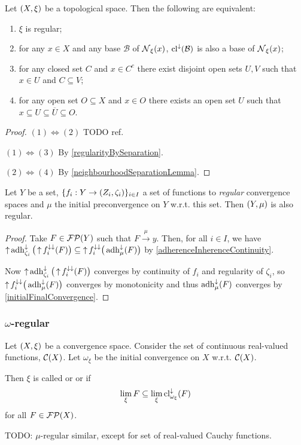 \begin{proposition} \label{topologicalRegularity}
Let $\sSet{X,\xi}$ be a topological space. Then the following are equivalent:
\begin{enumerate}
\item $\xi$ is regular;
\item for any $x\in X$ and any base $\mathcal{B}$ of $\operatorname{\mathcal{N}}_\xi(x)$, $\operatorname{cl}^\downarrow(\mathcal{B})$ is also a base of $\operatorname{\mathcal{N}}_\xi(x)$;
\item for any closed set $C$ and $x\in C^c$ there exist disjoint open sets $U,V$ such that $x\in U$ and $C\subseteq V$;
\item for any open set $O\subseteq X$ and $x\in O$ there exists an open set $U$ such that $x\subseteq U\subseteq \overline{U} \subseteq O$.
\end{enumerate}
\end{proposition}
\begin{proof}
$(1) \Leftrightarrow (2)$ TODO ref.

$(1) \Leftrightarrow (3)$ By \ref{regularityBySeparation}.

$(2) \Leftrightarrow (4)$ By \ref{neighbourhoodSeparationLemma}.
\end{proof}

\begin{proposition} \label{regularityInitialConvergence}
Let $Y$ be a set, $\{f_i: Y\to \sSet{Z_i, \zeta_i}\}_{i\in I}$ a set of functions to \emph{regular} convergence spaces and $\mu$ the initial preconvergence on $Y$ w.r.t. this set. Then $\sSet{Y,\mu}$ is also regular.
\end{proposition}
\begin{proof}
Take $F\in \operatorname{\mathcal{FP}}(Y)$ such that $F\overset{\mu}{\longrightarrow} y$. Then, for all $i\in I$, we have $\operatorname{\uparrow}\operatorname{adh}_{\zeta_i}^\downarrow\big(\operatorname{\uparrow} f_i^{\downarrow\downarrow}(F)\big)\subseteq \operatorname{\uparrow} f_i^{\downarrow\downarrow}\big(\operatorname{adh}_{\mu}^{\downarrow}(F)\big)$ by \ref{adherenceInherenceContinuity}.

Now $\operatorname{\uparrow}\operatorname{adh}_{\zeta_i}^\downarrow\big(\operatorname{\uparrow} f_i^{\downarrow\downarrow}(F)\big)$ converges by continuity of $f_i$ and regularity of $\zeta_i$, so $\operatorname{\uparrow} f_i^{\downarrow\downarrow}\big(\operatorname{adh}_{\mu}^{\downarrow}(F)\big)$ converges by monotonicity and thus $\operatorname{adh}_{\mu}^{\downarrow}(F)$ converges by \ref{initialFinalConvergence}.
\end{proof}

\subsubsection{$\omega$-regular}
\begin{definition}
Let $\sSet{X,\xi}$ be a convergence space. Consider the set of continuous real-valued functions, $\operatorname{\mathcal{C}}(X)$. Let $\omega_\xi$ be the initial convergence on $X$ w.r.t. $\operatorname{\mathcal{C}}(X)$.

Then $\xi$ is called  or  or  if
\[ \lim_\xi F \subseteq \lim_\xi \operatorname{cl}_{\omega_\xi}^\downarrow(F) \]
for all $F\in \operatorname{\mathcal{FP}}(X)$.
\end{definition}
TODO: $\mu$-regular similar, except for set of real-valued Cauchy functions.

